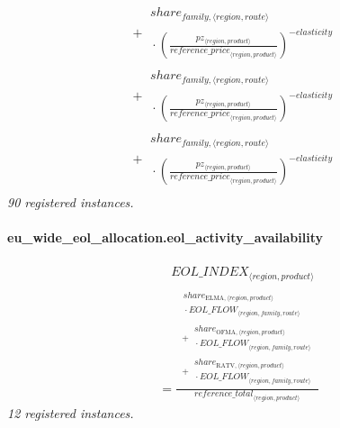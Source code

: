 \documentclass[11pt]{article}
\begin{document}
\begin{align*}
{\begin{aligned}
\begin{aligned}
\end{aligned}\\
{}+ \begin{aligned}
share_{family,\langle region, route\rangle}\\
{}\cdot {\left(\frac{pz_{\langle region, product\rangle}}{{reference\_price}_{\langle region, product\rangle}}\right)}^{-elasticity}
\end{aligned}\\
{}+ \begin{aligned}
share_{family,\langle region, route\rangle}\\
{}\cdot {\left(\frac{pz_{\langle region, product\rangle}}{{reference\_price}_{\langle region, product\rangle}}\right)}^{-elasticity}
\end{aligned}\\
{}+ \begin{aligned}
share_{family,\langle region, route\rangle}\\
{}\cdot {\left(\frac{pz_{\langle region, product\rangle}}{{reference\_price}_{\langle region, product\rangle}}\right)}^{-elasticity}
\end{aligned}
\end{aligned}}
\end{align*}
\noindent\emph{90 registered instances.}\par
\paragraph{eu\_wide\_eol\_allocation.eol\_activity\_availability}
\begin{align*}
&\quad {EOL\_INDEX}_{\langle region, product\rangle}\\
&= \frac{\begin{aligned}
\begin{aligned}
share_{\text{ELMA},\langle region, product\rangle}\\
{}\cdot {EOL\_FLOW}_{\langle region, family, route\rangle}
\end{aligned}\\
{}+ \begin{aligned}
share_{\text{OFMA},\langle region, product\rangle}\\
{}\cdot {EOL\_FLOW}_{\langle region, family, route\rangle}
\end{aligned}\\
{}+ \begin{aligned}
share_{\text{RATV},\langle region, product\rangle}\\
{}\cdot {EOL\_FLOW}_{\langle region, family, route\rangle}
\end{aligned}
\end{aligned}}{{reference\_total}_{\langle region, product\rangle}}
\end{align*}
\noindent\emph{12 registered instances.}\par
\end{document}
